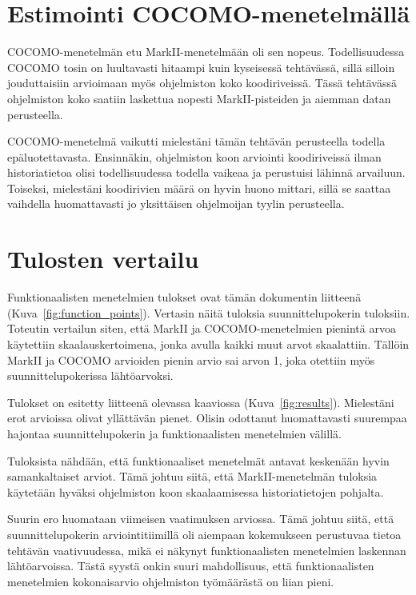 \documentclass[a4paper]{article}
\begin{document}
\section{Estimointi COCOMO-menetelmällä}

COCOMO-menetelmän etu MarkII-menetelmään oli sen nopeus. Todellisuudessa COCOMO tosin on luultavasti hitaampi kuin kyseisessä tehtävässä, sillä silloin jouduttaisiin arvioimaan myös ohjelmiston koko koodiriveissä. Tässä tehtävässä ohjelmiston koko saatiin laskettua nopesti MarkII-pisteiden ja aiemman datan perusteella.

COCOMO-menetelmä vaikutti mielestäni tämän tehtävän perusteella todella epäluotettavasta. Ensinnäkin, ohjelmiston koon arviointi koodiriveissä ilman historiatietoa olisi todellisuudessa todella vaikeaa ja perustuisi lähinnä arvailuun. Toiseksi, mielestäni koodirivien määrä on hyvin huono mittari, sillä se saattaa vaihdella huomattavasti jo yksittäisen ohjelmoijan tyylin perusteella.

\section{Tulosten vertailu}

Funktionaalisten menetelmien tulokset ovat tämän dokumentin liitteenä (Kuva~\ref{fig:function_points}). Vertasin näitä tuloksia suunnittelupokerin tuloksiin. Toteutin vertailun siten, että MarkII ja COCOMO-menetelmien pienintä arvoa käytettiin skaalauskertoimena, jonka avulla kaikki muut arvot skaalattiin. Tällöin MarkII ja COCOMO arvioiden pienin arvio sai arvon 1, joka otettiin myös suunnittelupokerissa lähtöarvoksi.

Tulokset on esitetty liitteenä olevassa kaaviossa (Kuva~\ref{fig:results}). Mielestäni erot arvioissa olivat yllättävän pienet. Olisin odottanut huomattavasti suurempaa hajontaa suunnittelupokerin ja funktionaalisten menetelmien välillä.

Tuloksista nähdään, että funktionaaliset menetelmät antavat keskenään hyvin samankaltaiset arviot. Tämä johtuu siitä, että MarkII-menetelmän tuloksia käytetään hyväksi ohjelmiston koon skaalaamisessa historiatietojen pohjalta.

Suurin ero huomataan viimeisen vaatimuksen arviossa. Tämä johtuu siitä, että suunnittelupokerin arviointitiimillä oli aiempaan kokemukseen perustuvaa tietoa tehtävän vaativuudessa, mikä ei näkynyt funktionaalisten menetelmien laskennan lähtöarvoissa. Tästä syystä onkin suuri mahdollisuus, että funktionaalisten menetelmien kokonaisarvio ohjelmiston työmäärästä on liian pieni.
\end{document}
